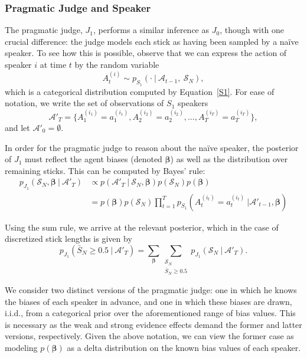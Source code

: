\documentclass[10pt,letterpaper]{article}
\begin{document}
\subsubsection{Pragmatic Judge and Speaker}
The pragmatic judge, $J_1$, performs a similar inference as $J_0$, though with one crucial difference: the judge
models each stick as having been sampled by a na\"ive speaker. To see how this is possible, observe that we can express
the action of speaker $i$ at time $t$ by the random variable 
\begin{equation}
	A_t^{(i)} \sim p_{S_1} (\cdot \ | \ \mathcal{A}_{t-1},\ \mathcal{S}_N),
\end{equation}
which is a categorical distribution computed by Equation~\ref{S1}. For ease of notation, we write the set
of observations of $S_1$ speakers
\begin{equation}
	\mathcal{A}'_T = \{ A_1^{(i_1)}=a_1^{(i_1)}, A_2^{(i_2)}=a_2^{(i_2)}, ..., A_T^{(i_T)}=a_T^{(i_T)}\}, 
\end{equation}
and let $\mathcal{A}'_0 = \emptyset$.

In order for the pragmatic judge to reason about the na\"ive speaker, the posterior of $J_1$ must reflect the agent
biases (denoted $\bm{\beta}$) as well as the distribution over remaining sticks. This can be computed by Bayes' rule:
\begin{align*}
	p_{J_1} (\mathcal{S}_N, \bm{\beta} \ | \ \mathcal{A}'_T) &\propto p(\mathcal{A}'_T \ | \ \mathcal{S}_N, \bm{\beta}) p(\mathcal{S}_N) p(\bm{\beta}) \\
	&= p(\bm{\beta}) p(\mathcal{S}_N) \prod_{t=1}^T p_{S_1}(A_t^{(i_t)}=a_t^{(i_t)} \ |  \mathcal{A}'_{t-1}, \bm{\beta})
\end{align*}

Using the sum rule, we arrive at the relevant posterior, which in the case of discretized stick lengths is given by
\begin{equation}
	p_{J_1} ( \bar{S}_N \ge 0.5 \ | \ \mathcal{A}'_T ) = \sum_{\bm{\beta}} \sum_{\substack{\mathcal{S}_N \\ \bar{S}_N \ge 0.5}} p_{J_1} (\mathcal{S}_N \ | \ \mathcal{A}'_T).
\end{equation}

We consider two distinct versions of the pragmatic judge: one in which he knows the biases of each speaker in advance, and
one in which these biases are drawn, i.i.d., from a categorical prior over the aforementioned range of bias values. This is 
necessary as the weak and strong evidence effects demand the former and latter versions, respectively. Given the above notation,
we can view the former case as modeling $p(\bm{\beta})$ as a delta distribution on the known bias values of each speaker.
\end{document}
